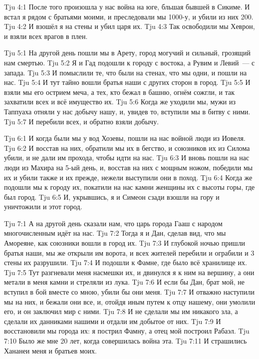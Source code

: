 \vs Tju 4:1
После того произошла у нас война на юге, бльшая бывшей в Сикиме.
И встал я рядом с братьями моими, и преследовали мы 1000-у,
и убили из них 200.
\vs Tju 4:2
И взошёл я на стены и убил царя их.
\vs Tju 4:3
Так освободили мы Хеврон, и взяли всех врагов в плен.

\vs Tju 5:1
На другой день пошли мы в Арету, город могучий и сильный,
грозящий нам смертью.
\vs Tju 5:2
Я и Гад подошли к городу с востока, а Рувим и Левий~--- с запада.
\vs Tju 5:3
И помыслили те, что были на стенах, что мы одни, и пошли на нас.
\vs Tju 5:4
И тут тайно вошли братья наши с других сторон в город.
\vs Tju 5:5
И взяли мы его острием меча, а тех, кто бежал в башню,
огнём сожгли, и так захватили всех и всё имущество их.
\vs Tju 5:6
Когда же уходили мы, мужи из Таппуаха отняли у нас добычу нашу,
и, увидев то, вступили мы в битву с ними.
\vs Tju 5:7
И перебили всех, и обратно взяли добычу.

\vs Tju 6:1
И когда были мы у вод Хозевы, пошли на нас войной люди из Иовеля.
\vs Tju 6:2
И восстав на них, обратили мы их в бегство,
и союзников их из Силома убили,
и не дали им прохода, чтобы идти на нас.
\vs Tju 6:3
И вновь пошли на нас люди из Махира на 5-ый день,
и, восстав на них с мощным ножом,
победили мы их и убили также и их прежде,
нежели выступили они в поход.
\vs Tju 6:4
Когда же подошли мы к городу их,
покатили на нас камни женщины их с высоты горы, где был город.
\vs Tju 6:5
И, укрывшись, я и Симеон сзади взошли на гору и уничтожили и этот город.

\vs Tju 7:1
А на другой день сказали нам,
что царь города Гааш с народом многочисленным идёт на нас.
\vs Tju 7:2
Тогда я и Дан, сделав вид, что мы Амореяне,
как союзники вошли в город их.
\vs Tju 7:3
И глубокой ночью пришли братья наши, мы же открыли им ворота,
и всех жителей перебили и ограбили и 3 стены их разрушили.
\vs Tju 7:4
И подошли к Фамне, где было всё хранилище их.
\vs Tju 7:5
Тут разгневали меня насмешки их, и двинулся я к ним на вершину,
а они метали в меня камни и стреляли из лука.
\vs Tju 7:6
И если бы Дан, брат мой, не вступил в бой вместе со мною, убили бы они меня.
\vs Tju 7:7
И отважно наступили мы на них, и бежали они все, и,
отойдя иным путем к отцу нашему, они умолили его, и он заключил мир с ними.
\vs Tju 7:8
И не сделали мы им никакого зла,
а сделали их данниками нашими и отдали им добытое от них.
\vs Tju 7:9
И восстановили мы города их:
я пострил Фамну, а отец мой построил Рабаэл.
\vs Tju 7:10
Было же мне 20 лет, когда совершилась война эта.
\vs Tju 7:11
И страшились Хананеи меня и братьев моих.

